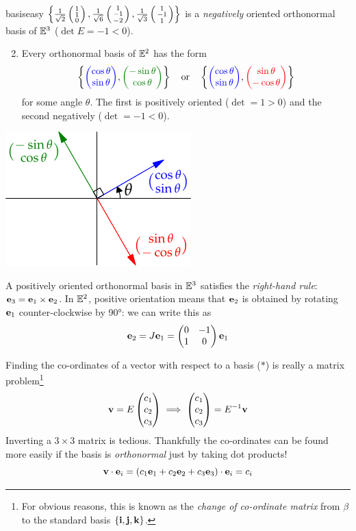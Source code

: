 \begin{examples}{}{basiseasy}
\exstart $\left\{\frac 1{\sqrt 2}\left(\begin{smallmatrix}1\\1\\0\end{smallmatrix}\right),\frac 1{\sqrt 6}\left(\begin{smallmatrix}1\\-1\\-2\end{smallmatrix}\right),\frac 1{\sqrt 3}\left(\begin{smallmatrix}1\\-1\\1\end{smallmatrix}\right)\right\}$ is a \emph{negatively} oriented orthonormal basis of $\mathbb{E}^3$ ($\det E=-1<0$).\par
\begin{minipage}[t]{0.7\linewidth}\vspace{0pt}
\begin{enumerate}\setcounter{enumi}{1}
  \item Every orthonormal basis of $\mathbb{E}^2$ has the form
  \[\left\{\textcolor{blue}{\twovec{\cos\theta}{\sin\theta}},\textcolor{Green}{\twovec{-\sin\theta}{\cos\theta}}\right\}\quad\text{or}\quad \left\{\textcolor{blue}{\twovec{\cos\theta}{\sin\theta}},\textcolor{red}{\twovec{\sin\theta}{-\cos\theta}}\right\}\]
  for some angle $\theta$. The first is positively oriented ($\det=1>0$) and the second negatively ($\det =-1<0$).
\end{enumerate}
\end{minipage}\hfill\begin{minipage}[t]{0.29\linewidth}\vspace{0pt}
	\flushright\includegraphics{moving-orthe2}
\end{minipage}
\end{examples}

A positively oriented orthonormal basis in $\mathbb{E}^3$ satisfies the \emph{right-hand rule}: ${\mathbf{e}}_3={\mathbf{e}}_1\times{\mathbf{e}}_2$. In $\mathbb{E}^2$, positive orientation means that ${\mathbf{e}}_2$ is obtained by rotating ${\mathbf{e}}_1$ counter-clockwise by \ang{90}: we can write this as
\[{\mathbf{e}}_2=J{\mathbf{e}}_1=\begin{pmatrix}
0&-1\\1&0
\end{pmatrix}{\mathbf{e}}_1\]

Finding the co-ordinates of a vector with respect to a basis ($\ast$) is really a matrix problem\footnote{For obvious reasons, this is known as the \emph{change of co-ordinate matrix} from $\beta$ to the standard basis $\{{\mathbf{i}},{\mathbf{j}},{\mathbf{k}}\}$.}
\[{\mathbf{v}}=E\begin{pmatrix}c_1\\c_2\\c_3\end{pmatrix}\implies \begin{pmatrix}c_1\\c_2\\c_3\end{pmatrix}=E^{-1}{\mathbf{v}}\]
Inverting a $3\times 3$ matrix is tedious. Thankfully the co-ordinates can be found more easily if the basis is \emph{orthonormal} just by taking dot products!
\[{\mathbf{v}}\cdot{\mathbf{e}}_i=(c_1{\mathbf{e}}_1+c_2{\mathbf{e}}_2+c_3{\mathbf{e}}_3)\cdot {\mathbf{e}}_i =c_i\]

